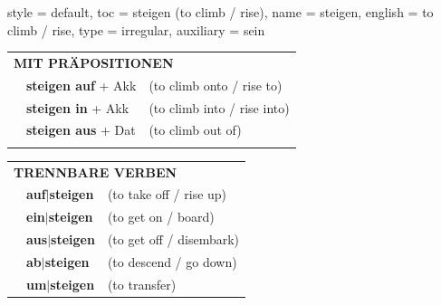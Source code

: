 \begin{verbentry}{
  style = {default},
  toc = {steigen (to climb / rise)},
  name = {steigen},
  english = {to climb / rise},
  type = {irregular},
  auxiliary = {sein}
}
 \vspace{10pt}

\begin{tabular}{lll}
      \multicolumn{3}{l}{\textbf{MIT PRÄPOSITIONEN}}\\
& \textbf{steigen auf} + Akk & (to climb onto / rise to)\\
& \textbf{steigen in} + Akk & (to climb into / rise into)\\
& \textbf{steigen aus} + Dat & (to climb out of)\\
\vspace{20pt}
\end{tabular}
  \hfill
\begin{tabular}{lll}
      \multicolumn{3}{l}{\textbf{TRENNBARE VERBEN}}\\
 & \textbf{auf$|$steigen} & (to take off / rise up)\\
 & \textbf{ein$|$steigen} & (to get on / board)\\
 & \textbf{aus$|$steigen} & (to get off / disembark)\\
 & \textbf{ab$|$steigen} & (to descend / go down)\\
  & \textbf{um$|$steigen} & (to transfer)\\
  \end{tabular}


  \vspace{-5pt}
\end{verbentry}

